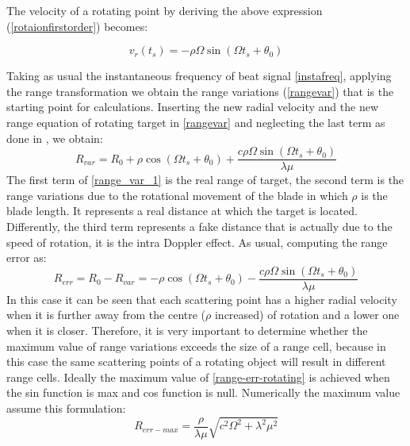 The velocity of a rotating point by deriving the above expression (\ref{rotaionfirstorder}) becomes:

\begin{equation}
v_{r}\left(t_{s}\right)=-\rho \Omega \sin \left(\Omega t_{s}+\theta_{0}\right)
\label{radialvelocityrot}
\end{equation}

Taking as usual the instantaneous frequency of beat signal \ref{instafreq}, applying the range transformation we obtain the range variations (\ref{rangevar}) that is the starting point for calculations. Inserting the new radial velocity and the new range equation of rotating target in \ref{rangevar} and neglecting the last term as done in \cite{chen_chinese}, we obtain:
\begin{equation}
    R_{var} = R_0+\rho \cos \left(\Omega t_{s}+\theta_{0}\right) + \frac{c \rho \Omega \sin \left(\Omega t_{s}+\theta_{0}\right)}{\lambda \mu}
    \label{range_var_1}
\end{equation}
The first term of \ref{range_var_1} is the real range of target, the second term is the range variations due to the rotational movement of the blade in which $\rho$ is the blade length. It represents a real distance at which the target is located. Differently, the third term represents a fake distance that is actually due to the speed of rotation, it is the intra Doppler effect.
As usual, computing the range error as:
\begin{equation}
    R_{err} = R_0 - R_{var} = -\rho \cos \left(\Omega t_{s}+\theta_{0}\right) - \frac{c \rho \Omega \sin \left(\Omega t_{s}+\theta_{0}\right)}{\lambda \mu}
    \label{range-err-rotating}
\end{equation} 
In this case it can be seen that each scattering point has a higher radial velocity when it is further away from the centre ($\rho$ increased) of rotation and a lower one when it is closer. Therefore, it is very important to determine whether the maximum value of range variations exceeds the size of a range cell, because in this case the same scattering points of a rotating object will result in different range cells. Ideally the maximum value of \ref{range-err-rotating} is achieved when the sin function is max and cos function is null. Numerically the maximum value assume this formulation:
\begin{equation}
R_{err-max} = \frac{\rho}{\lambda \mu} \sqrt{c^{2} \Omega^{2}+\lambda^{2} \mu^{2}}
\label{err-max-drone}
\end{equation}

